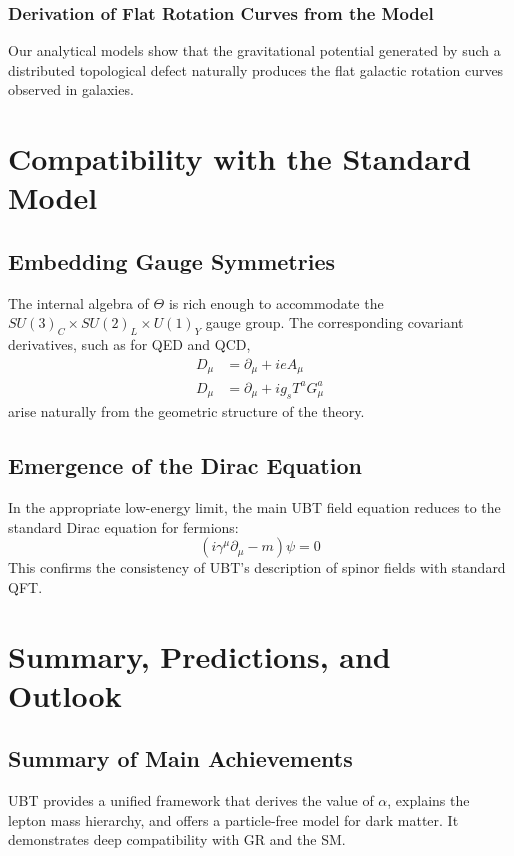 \documentclass[12pt, a4paper]{article}
\begin{document}
\subsubsection{Derivation of Flat Rotation Curves from the Model}
Our analytical models show that the gravitational potential generated by such a distributed topological defect naturally produces the flat galactic rotation curves observed in galaxies.

\section{Compatibility with the Standard Model}
\subsection{Embedding Gauge Symmetries}
The internal algebra of \( \Theta \) is rich enough to accommodate the \( SU(3)_C \times SU(2)_L \times U(1)_Y \) gauge group. The corresponding covariant derivatives, such as for QED and QCD,
\begin{align}
    D_\mu &= \partial_\mu + i e A_\mu \\
    D_\mu &= \partial_\mu + i g_s T^a G_\mu^a
\end{align}
arise naturally from the geometric structure of the theory.

\subsection{Emergence of the Dirac Equation}
In the appropriate low-energy limit, the main UBT field equation reduces to the standard Dirac equation for fermions:
\begin{equation}
    (i \gamma^\mu \partial_\mu - m)\psi = 0
\end{equation}
This confirms the consistency of UBT's description of spinor fields with standard QFT.

\section{Summary, Predictions, and Outlook}
\subsection{Summary of Main Achievements}
UBT provides a unified framework that derives the value of \( \alpha \), explains the lepton mass hierarchy, and offers a particle-free model for dark matter. It demonstrates deep compatibility with GR and the SM.
\end{document}
